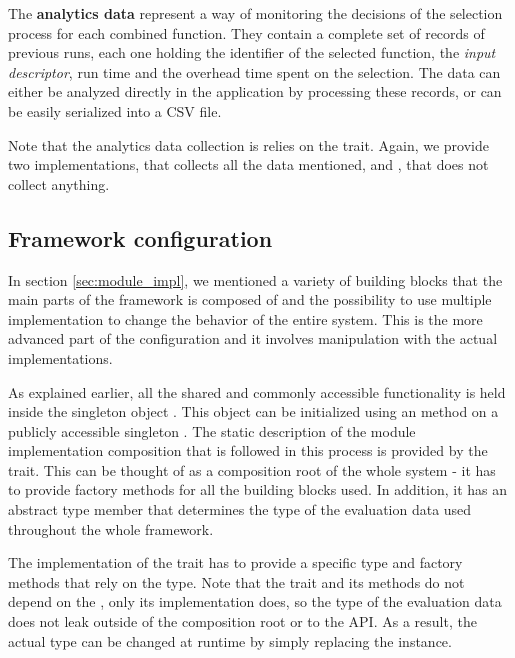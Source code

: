The \textbf{analytics data} represent a way of monitoring the decisions of the selection process for each combined function. They contain a complete set of records of previous runs, each one holding the identifier of the selected function, the \textit{input descriptor}, run time and the overhead time spent on the selection. The data can either be analyzed directly in the application by processing these records, or can be easily serialized into a CSV file.

Note that the analytics data collection is relies on the  trait. Again, we provide two implementations,  that collects all the data mentioned, and , that does not collect anything.

\subsection{Framework configuration}
\label{subsec:framework_config}

In section \ref{sec:module_impl}, we mentioned a variety of building blocks that the main parts of the framework is composed of and the possibility to use multiple implementation to change the behavior of the entire system. This is the more advanced part of the configuration and it involves manipulation with the actual implementations.

As explained earlier, all the shared and commonly accessible functionality is held inside the singleton object . This object can be initialized using an  method on a publicly accessible singleton . The static description of the module implementation composition that is followed in this process is provided by the  trait. This can be thought of as a composition root of the whole system - it has to provide factory methods for all the building blocks used. In addition, it has an abstract type member  that determines the type of the evaluation data used throughout the whole framework.

The implementation of the  trait has to provide a specific  type and factory methods that rely on the type. Note that the  trait and its methods do not depend on the , only its implementation does, so the type of the evaluation data does not leak outside of the composition root or to the API. As a result, the actual type can be changed at runtime by simply replacing the  instance.

